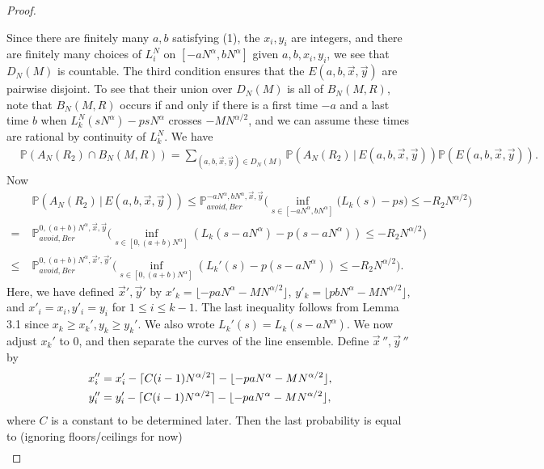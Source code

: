 \documentclass[12pt]{article}
\DeclarePairedDelimiter\floor{\lfloor}{\rfloor}
\begin{document}
\begin{proof}
\begin{enumerate}[label=(\arabic*)]
		\end{enumerate} 
		Since there are finitely many $a,b$ satisfying (1), the $x_i,y_i$ are integers, and there are finitely many choices of $L_i^N$ on $[-aN^\alpha, bN^\alpha]$ given $a,b,x_i,y_i$, we see that $D_N(M)$ is countable. The third condition ensures that the $E(a,b,\vec{x},\vec{y})$ are pairwise disjoint. To see that their union over $D_N(M)$ is all of $B_N(M,R)$, note that $B_N(M,R)$ occurs if and only if there is a first time $-a$ and a last time $b$ when $L_k^N(sN^\alpha)-psN^\alpha$ crosses $-MN^{\alpha/2}$, and we can assume these times are rational by continuity of $L_k^N$. We have
		\begin{align*}
		&\mathbb{P}(A_N(R_2) \cap B_N(M,R)) = \sum_{(a,b,\vec{x},\vec{y})\in D_N(M)} \mathbb{P}(A_N(R_2)\,|\,E(a,b,\vec{x},\vec{y}))\mathbb{P}(E(a,b,\vec{x},\vec{y})).
		\end{align*}
		Now
		\begin{align*}
		&\mathbb{P}(A_N(R_2)\,|\,E(a,b,\vec{x},\vec{y})) \leq \mathbb{P}^{-aN^\alpha, bN^\alpha, \vec{x}, \vec{y}}_{avoid, Ber} \Big( \inf_{s\in[-aN^\alpha, bN^\alpha]} \big(L_k(s) - ps\big) \leq -R_2N^{\alpha/2} \Big)\\
		= \; & \mathbb{P}^{0, (a+b)N^\alpha, \vec{x}, \vec{y}}_{avoid, Ber} \Big( \inf_{s\in[0,(a+b)N^\alpha]} (L_k(s-aN^\alpha) - p(s-aN^\alpha)) \leq -R_2N^{\alpha/2} \Big)\\
		\leq \; & \mathbb{P}^{0, (a+b)N^\alpha, \vec{x}', \vec{y}'}_{avoid, Ber} \Big( \inf_{s\in[0,(a+b)N^\alpha]} (L_k'(s) - p(s-aN^\alpha)) \leq -R_2N^{\alpha/2} \Big).
		\end{align*}
		Here, we have defined $\vec{x}',\vec{y}'$ by $x'_k = \lfloor-paN^\alpha - MN^{\alpha/2}\rfloor$, $ y'_k = \lfloor pbN^\alpha - MN^{\alpha/2}\rfloor$, and $x'_i=x_i, y'_i = y_i$ for $1\leq i\leq k-1$. The last inequality follows from Lemma 3.1 since $x_k \geq x_k', y_k\geq y_k'$. We also wrote $L_k'(s) = L_k(s-aN^\alpha)$. We now adjust $x_k'$ to 0, and then separate the curves of the line ensemble. Define  $\vec{x}\,'',\vec{y}\,''$ by 
		\begin{align*}
		x''_i &= x'_i - \lceil C(i-1)N^{\alpha/2}\rceil - \lfloor -paN^\alpha - MN^{\alpha/2}\rfloor,\\
		y''_i &= y'_i - \lceil C(i-1)N^{\alpha/2}\rceil - \floor{-paN^\alpha - MN^{\alpha/2}},
		\end{align*}
		where $C$ is a constant to be determined later. Then the last probability is equal to (ignoring floors/ceilings for now)
		\begin{align*}

\end{align*}
\end{proof}
\end{document}
